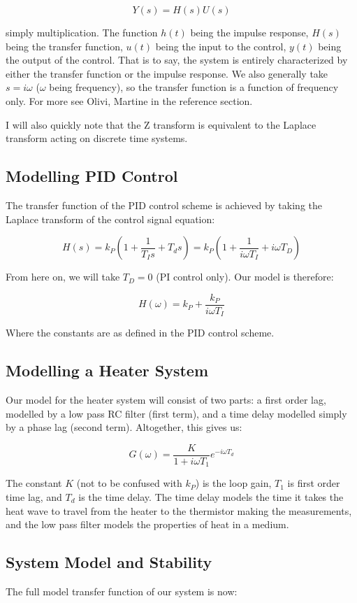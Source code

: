 \documentclass[11pt, letterpaper]{article}
\begin{document}
$$ Y(s) = H(s)U(s) $$

simply multiplication. The function $h(t)$ being the impulse response, $H(s)$ being the transfer function, $u(t)$ being the input to the control, $y(t)$ being the output of the control. That is to say, the system is entirely characterized by either the transfer function or the impulse response. We also generally take $s=i\omega$ ($\omega$ being frequency), so the transfer function is a function of frequency only. For more see Olivi, Martine in the reference section.


I will also quickly note that the Z transform is equivalent to the Laplace transform acting on discrete time systems.

\subsection{Modelling PID Control}
The transfer function of the PID control scheme is achieved by taking the Laplace transform of the control signal equation:

$$ H(s) = k_P \left( 1 + \frac{1}{T_I s} + T_d s \right) = k_P \left( 1 + \frac{1}{i \omega T_I } + i \omega T_D  \right) $$

From here on, we will take $T_D = 0$ (PI control only). Our model is therefore: 

$$ H(\omega) = k_P + \frac{k_P}{i\omega T_I} $$

Where the constants are as defined in the PID control scheme.

\subsection{Modelling a Heater System}
Our model for the heater system will consist of two parts: a first order lag, modelled by a low pass RC filter (first term), and a time delay modelled simply by a phase lag (second term). Altogether, this gives us:

$$ G(\omega) = \frac{K}{1+i\omega T_{1}} e^{-i \omega T_d} $$

The constant $K$ (not to be confused with $k_P$) is the loop gain, $T_1$ is first order time lag, and $T_d$ is the time delay. The time delay models the time it takes the heat wave to travel from the heater to the thermistor making the measurements, and the low pass filter models the properties of heat in a medium. 

\subsection{System Model and Stability}
The full model transfer function of our system is now:
\end{document}
